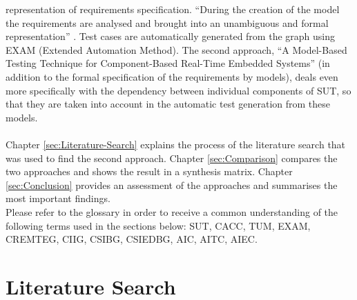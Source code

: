 representation of requirements specification. \enquote{During
the creation of the model the requirements are analysed and brought
into an unambiguous and formal representation} \cite{Siegl2010}.
Test cases are automatically generated from the graph using EXAM (Extended
Automation Method). The second approach, \enquote{A Model-Based
Testing Technique for Component-Based Real-Time Embedded Systems}
(in addition to the formal specification of the requirements by models),
deals even more specifically with the dependency between individual
components of SUT, so that they are taken into account in the automatic
test generation from these models.\\
 \\
Chapter \ref{sec:Literature-Search} explains the process of the literature
search that was used to find the second approach. Chapter \ref{sec:Comparison}
compares the two approaches and shows the result in a synthesis matrix.
Chapter \ref{sec:Conclusion} provides an assessment of the approaches
and summarises the most important findings.\\
Please refer to the glossary in order to receive a common understanding of the following terms used in the sections below: SUT, CACC, TUM, EXAM, CREMTEG, CIIG, CSIBG, CSIEDBG, AIC, AITC, AIEC.

\section{Literature Search\label{sec:Literature-Search}}

